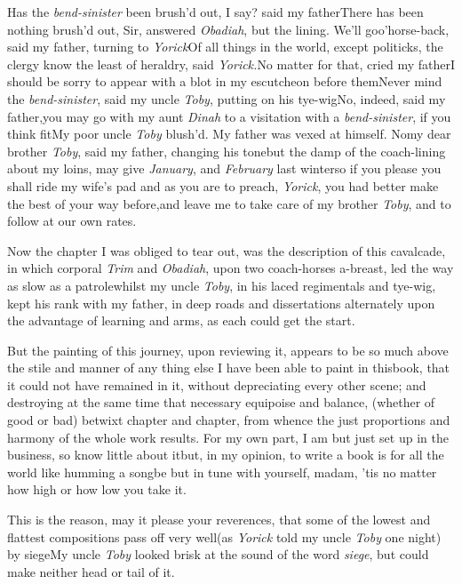 \documentclass{article}
\begin{document}
\tsk Has the \textit{bend-sinister} been brush’d out, I
say? said my father\tsk There has been nothing brush’d out, Sir, answered
\textit{Obadiah}, but the lining. We’ll go\break o’horse-back,
said my father, turning to \textit{Yorick}\tsk Of all things in the
world, except politicks, the clergy know the least of heraldry,
said \textit{Yorick.}\tsk No matter for that, cried my
father\tsk I should be sorry to appear with a blot in my
escutcheon before them\tsh Never mind the
\textit{bend-sinister}, said my uncle \textit{Toby}, putting
on his tye-wig\tsh No, indeed, said my father,\break \tsk you
may go with my aunt \textit{Dinah} to a visitation with a
\textit{bend-sinister}, if you think fit\tsk My poor uncle
\textit{Toby} blush’d. My father was vexed at himself.\tsk
No\tsk my dear brother \textit{Toby}, said my father,
changing his tone\tsk but the damp of the coach-lining about
my loins, may give  \textit{January}, and \textit{February} last
winter\tsk so if you please you shall ride my wife’s
pad\break\tsk
and as you are to preach, \textit{Yorick}, you had better
make the best of your way before,\tsk and leave me to take
care of my brother \textit{Toby}, and to follow at our\break
own rates.

Now the chapter I was obliged to tear out, was the description
of this cavalcade, in which corporal \textit{Trim} and
\textit{Obadiah}, upon two coach-horses a-breast, led the way as slow
as a patrole\tsh whilst my uncle \textit{Toby}, in his laced
regimentals and tye-wig, kept his rank with my father, in deep
roads and dissertations alternately upon the advantage of learning
and arms, as each could get the start.


\tsk But the painting of this journey, upon reviewing it,
appears to be so much above the stile and manner of any thing else
I have been able to paint in this\break book, that it could not have
remained in it, without depreciating every other scene; and
destroying at the same time that necessary equipoise and
balance,\break
(whether of good or bad) betwixt chapter and chapter, from whence
the just proportions and harmony of the whole work results. For my
own part, I am but just set up in the business, so know little
about it\tsk but, in my opinion, to write a book is for all the
world like humming a song\tsk be but in tune with yourself,
madam, ’tis no matter how high or how low you take it.\tsk


\tsk This is the reason, may it please your reverences, that
some of the lowest and flattest compositions pass off
very\break
well\tsk (as \textit{Yorick} told my uncle \textit{Toby} one
night) by siege\tsk My uncle \textit{Toby} looked brisk at
the sound of the word \textit{siege}, but could make neither head or tail of
it.
\end{document}
